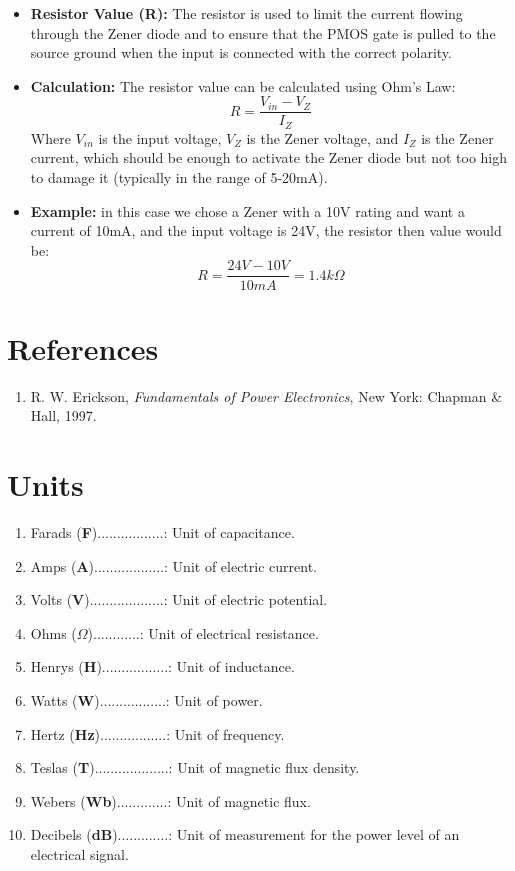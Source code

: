 \documentclass{article}
\begin{document}
\begin{itemize}
    \item \textbf{Resistor Value (R):} The resistor is used to limit the current flowing through the Zener diode and to ensure that the PMOS gate is pulled to the source ground when the input is connected with the correct polarity.
    
    \item \textbf{Calculation:} The resistor value can be calculated using Ohm's Law:
    \[
    R = \frac{V_{in} - V_{Z}}{I_{Z}}
    \]
    Where \(V_{in}\) is the input voltage, \(V_{Z}\) is the Zener voltage, and \(I_{Z}\) is the Zener current, which should be enough to activate the Zener diode but not too high to damage it (typically in the range of 5-20mA).
    
    \item \textbf{Example:} in this case we chose a Zener with a 10V rating and want a current of 10mA, and the input voltage is 24V, the resistor then value would be:
    \[
    R = \frac{24V - 10V}{10mA} = 1.4k\Omega
    \]
\end{itemize}

\section{References}

\begin{enumerate}
    \item R. W. Erickson, \textit{Fundamentals of Power Electronics}, New York: Chapman \& Hall, 1997.
\end{enumerate}

\section{Units}

\begin{enumerate}
    \item Farads (\textbf{F}).................: Unit of capacitance.
    \item Amps (\textbf{A})..................: Unit of electric current.
    \item Volts (\textbf{V})...................: Unit of electric potential.
    \item Ohms (\textbf{$\Omega$})............: Unit of electrical resistance.
    \item Henrys (\textbf{H}).................: Unit of inductance.
    \item Watts (\textbf{W}).................: Unit of power.
    \item Hertz (\textbf{Hz}).................: Unit of frequency.
    \item Teslas (\textbf{T})...................: Unit of magnetic flux density.
    \item Webers (\textbf{Wb}).............: Unit of magnetic flux.
    \item Decibels (\textbf{dB}).............: Unit of measurement for the power level of an electrical signal.
\end{enumerate}

\end{document}

